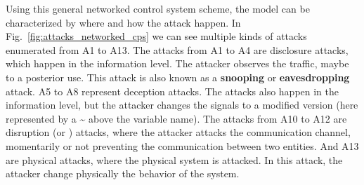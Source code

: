 \documentclass[../main.tex]{subfiles}
\begin{document}
Using this general networked control system scheme, the \DDD{} model can be characterized by where and how the attack happen.
In Fig.~\ref{fig:attacks_networked_cps} we can see multiple kinds of attacks enumerated from A1 to A13.
The attacks from A1 to A4 are disclosure attacks, which happen in the information level. The attacker observes the traffic, maybe to a posterior use.
This attack is also known as a \textbf{snooping} or \textbf{eavesdropping} attack.
A5 to A8 represent deception attacks.
The attacks also happen in the information level, but the attacker changes the signals to a modified version (here represented by a \~{} above the variable name).
The attacks from A10 to A12 are disruption (or \textbf{\DoS{}}) attacks, where the attacker attacks the communication channel, momentarily or not preventing the communication between two entities.
And A13 are physical attacks, where the physical system is attacked.
In this attack, the attacker change physically the behavior of the system.
\end{document}
